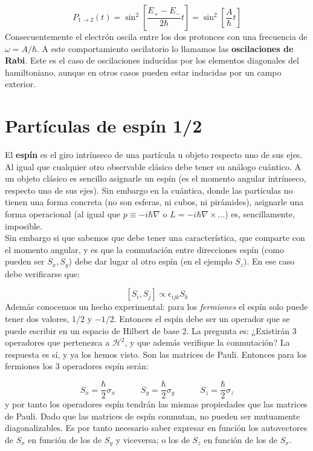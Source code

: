 \documentclass[12pt,a4paper]{book}
\numberwithin{equation}{chapter}
\numberwithin{figure}{chapter}
\newcommand{\tquad}{\quad \quad \quad}
\newcommand{\ccorchetes}[1]{\left[ #1  \right]}
\begin{document}
\begin{equation}
P_{1 \rightarrow 2}  (t) = \sin^2 \ccorchetes{\frac{E_+ - E_-}{2 \hbar} t} = \sin^2 \ccorchetes{\frac{A}{\hbar} t} 
\end{equation}
Consecuentemente el electrón oscila entre los dos protonces con una frecuencia de $\omega = A / \hbar$. A este comportamiento oscilatorio lo llamamos las \textbf{oscilaciones de Rabi}. Este es el caso de oscilaciones inducidas por los elementos diagonales del hamiltoniano, aunque en otros casos pueden estar inducidas por un campo exterior.

 \hrulefill 

\section{Partículas de espín 1/2}

El \textbf{espín} es el giro intrínseco de una partícula u objeto respecto uno de sus ejes. Al igual que cualquier otro observable clásico debe tener su análogo cuántico. A un objeto clásico es sencillo asignarle un espín (es el momento angular intrínseco, respecto uno de sus ejes). Sin embargo en la cuántica, donde las partículas no tienen una forma concreta (no son esferas, ni cubos, ni pirámides), asignarle una forma  operacional (al igual que $p \equiv - i \hbar \nabla$ o $L = - i \hbar \nabla \times$...) es, sencillamente, imposible. \\

Sin embargo si que sabemos que debe tener una característica, que comparte con el momento angular, y es que la conmutación entre direcciones espín (como pueden ser $S_x,S_y$) debe dar lugar al otro espín (en el ejemplo $S_z$). En ese caso debe verificarse que:

$$[S_i, S_j] \propto \epsilon_{ijk} S_k $$
Además conocemos un hecho experimental: para los \textit{fermiones} el espín solo puede tener dos valores, $1/2$ y $-1/2$. Entonces el espín debe ser un operador que se puede escribir en un espacio de Hilbert de base 2. La pregunta es: ¿Existirán 3 operadores que pertenezca a $\mathcal{H}^2$, y que además verifique la conmutación? La respuesta es sí, y ya los hemos visto. Son las matrices de Pauli. Entonces para los fermiones los 3 operadores espín serán:

\begin{equation}
S_x = \frac{\hbar}{2} \sigma_x \tquad 
S_y = \frac{\hbar}{2} \sigma_y \tquad
S_z = \frac{\hbar}{2} \sigma_z
\end{equation}
y por tanto los operadores espín tendrán las mismas propiedades que las matrices de Pauli. Dado que las matrices de espín conmutan, no pueden ser mutuamente diagonalizables. Es por tanto necesario saber expresar en función los autovectores de $S_x$ en función de los de $S_y$ y viceversa; o los de $S_z$ en función de los de $S_x$. \\
\end{document}
